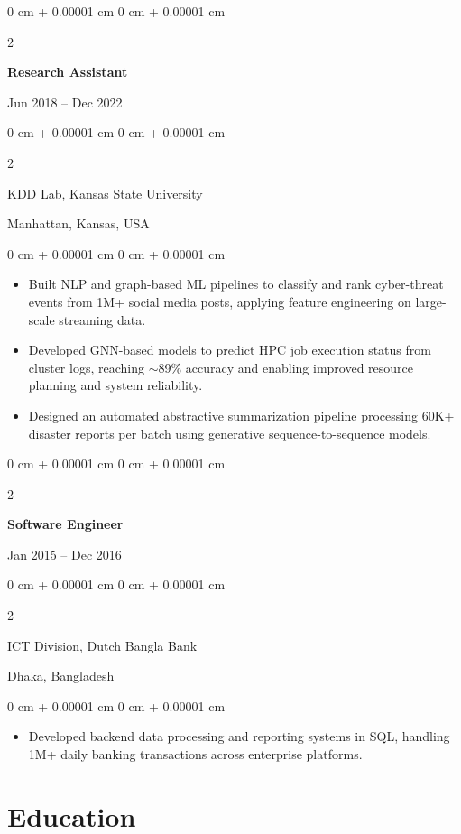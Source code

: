\documentclass[10pt, letterpaper]{article}
\newenvironment{highlights}{
    \begin{itemize}[
        topsep=0.10 cm,
        parsep=0.10 cm,
        partopsep=0pt,
        itemsep=0pt,
        leftmargin=0 cm + 10pt
    ]
}{
    \end{itemize}
} %
\newenvironment{onecolentry}{
    \begin{adjustwidth}{
        0 cm + 0.00001 cm
    }{
        0 cm + 0.00001 cm
    }
}{
    \end{adjustwidth}
} %
\newenvironment{twocolentry}[2][]{
    \onecolentry
    \def\secondColumn{#2}
    \setcolumnwidth{\fill, 4.5 cm}
    \begin{paracol}{2}
}{
    \switchcolumn \raggedleft \secondColumn
    \end{paracol}
    \endonecolentry
} %
\begin{document}
    \vspace{1mm}

    \begin{twocolentry}{Jun 2018 -- Dec 2022}
        \textbf{Research Assistant}
    \end{twocolentry}
    \begin{twocolentry}{Manhattan, Kansas, USA}
       KDD Lab, Kansas State University
    \end{twocolentry}
    \vspace{0.10 cm}
    \begin{onecolentry}
        \begin{highlights}
            \item Built NLP and graph-based ML pipelines to classify and rank cyber-threat events from 1M+ social media posts, applying feature engineering on large-scale streaming data.
            \item Developed GNN-based models to predict HPC job execution status from cluster logs, reaching $\sim$89\% accuracy and enabling improved resource planning and system reliability.
            \item Designed an automated abstractive summarization pipeline processing 60K+ disaster reports per batch using generative sequence-to-sequence models.
        \end{highlights}
    \end{onecolentry}

    \vspace{0.1 cm}
    \begin{twocolentry}{Jan 2015 -- Dec 2016}
        \textbf{Software Engineer}
    \end{twocolentry}
    \begin{twocolentry}{Dhaka, Bangladesh}
       ICT Division, Dutch Bangla Bank
    \end{twocolentry}

    \begin{onecolentry}
        \begin{highlights}
            \item Developed backend data processing and reporting systems in SQL, handling 1M+ daily banking transactions across enterprise platforms.
        \end{highlights}
    \end{onecolentry}

\section{Education}
\end{document}
